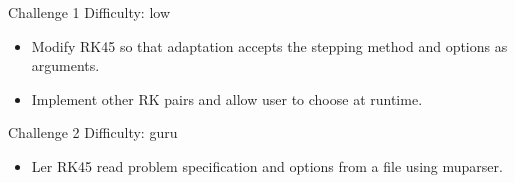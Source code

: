 \documentclass{beamer}
\begin{document}
\begin{frame}{Challenge 1}
\alert{Difficulty: low}

\begin{itemize}
\item Modify RK45 so that adaptation accepts the stepping method and options as arguments.
\item Implement other RK pairs and allow user to choose at runtime.
\end{itemize}
\end{frame}

\begin{frame}{Challenge 2}
\alert{Difficulty: guru}

\begin{itemize}
\item Ler RK45 read problem specification and options from a file using muparser.
\end{itemize}

\end{frame}
\end{document}

